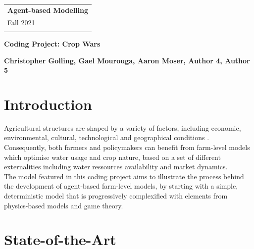 \documentclass[a4paper,12pt]{article} %
\begin{document}
\thispagestyle{empty} %
\begin{tabular}{p{15.5cm}} %
{\large \bf Agent-based Modelling} \\
Fall 2021  \\
\hline %
\\
\end{tabular} %
\vspace*{0.3cm} %

\begin{center} %
	{\Large \bf Coding Project: Crop Wars}
	\vspace{2mm}
	
	{\bf Christopher Golling, Gael Mourouga, Aaron Moser, Author 4, Author 5 } %
		
\end{center}  

\vspace{0.4cm}

\section{Introduction}

Agricultural structures are shaped by a variety of factors, including economic, environmental, cultural, technological and geographical conditions \cite{happeAgriculturalPoliciesFarm2004}. \\
Consequently, both farmers and policymakers can benefit from farm-level models which optimise water usage and crop nature, based on a set of different externalities including water ressources availability and market dynamics.\\
The model featured in this coding project aims to illustrate the process behind the development of agent-based farm-level models, by starting with a simple, deterministic model that is progressively complexified with elements from physics-based models and game theory.


\section{State-of-the-Art}
\end{document}
